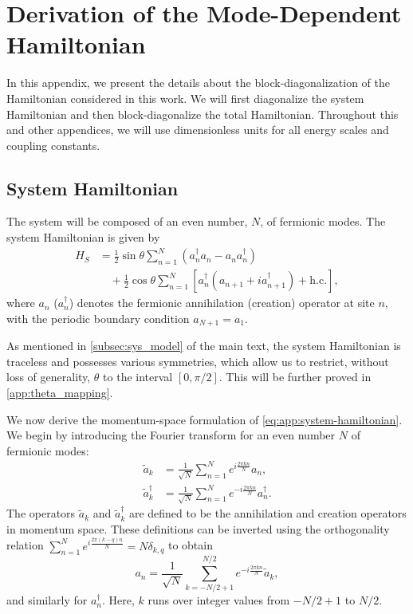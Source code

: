 \section{Derivation of the Mode-Dependent Hamiltonian}
\label{app:Hk_derivation}

In this appendix, we present the details about the block-diagonalization of the Hamiltonian considered in this work. We will first diagonalize the system Hamiltonian and then block-diagonalize the total Hamiltonian. Throughout this and other appendices, we will use dimensionless units for all energy scales and coupling constants.

\subsection{System Hamiltonian}

The system will be composed of an even number, $N$, of fermionic modes. The system Hamiltonian is given by
\begin{align}
    H_S &= \frac{1}{2} \sin\theta \sum_{n=1}^N (a_n^\dagger a_n - a_n a_n^\dagger)\nonumber\\
        &\quad + \frac{1}{2} \cos\theta \sum_{n=1}^N [a_n^\dagger (a_{n+1} + i a_{n+1}^\dagger) + \text{h.c.}],
    \label{eq:app:system-hamiltonian}
\end{align}
where $a_n$ ($a_n^\dagger$) denotes the fermionic annihilation (creation) operator at site $n$, with the periodic boundary condition $a_{N+1} = a_{1}$.

As mentioned in \cref{subsec:sys_model} of the main text, the system Hamiltonian is traceless and possesses various symmetries, which allow us to restrict, without loss of generality, $\theta$ to the interval $[0,\pi/2]$. This will be further proved in \cref{app:theta_mapping}.

We now derive the momentum-space formulation of \cref{eq:app:system-hamiltonian}. We begin by introducing the Fourier transform for an even number $N$ of fermionic modes:
\begin{align}
    \tilde{a}_k         &= \frac{1}{\sqrt{N}} \sum_{n=1}^N e^{i \frac{2\pi k n}{N}} a_n,\\
    \tilde{a}_k^\dagger &= \frac{1}{\sqrt{N}} \sum_{n=1}^N e^{-i \frac{2\pi k n}{N}} a_n^\dagger.
\end{align}
The operators $\tilde{a}_k$ and $\tilde{a}_k^\dagger$ are defined to be the annihilation and creation operators in momentum space. These definitions can be inverted using the orthogonality relation $\sum_{n=1}^N e^{i \frac{2\pi (k-q) n}{N}} = N \delta_{k,q}$ to obtain
\begin{equation}
    \label{eq:fourier_def_ann}
    a_n = \frac{1}{\sqrt{N}} \sum_{k=-N/2+1}^{N/2} e^{-i \frac{2\pi k n}{N}}  \tilde{a}_k,
\end{equation}
and similarly for $a_n^\dagger$. Here, $k$ runs over integer values from $-N/2+1$ to $N/2$.

